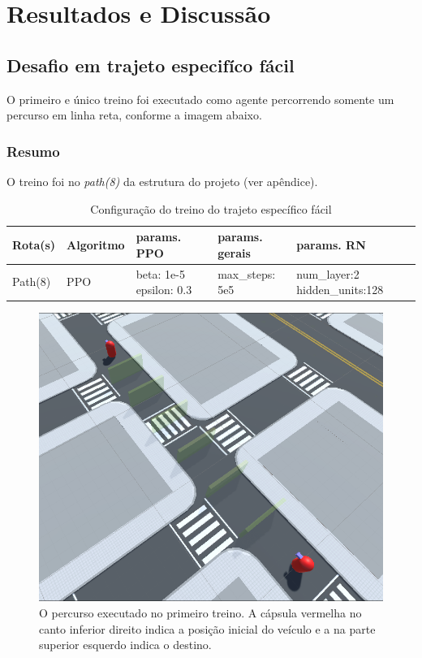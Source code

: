 \chapter{Resultados e Discussão}\label{cap:resultados}

\section{Desafio em trajeto especifíco fácil}

O primeiro e único treino foi executado como agente percorrendo somente um percurso em linha reta, conforme a imagem abaixo.

\subsection*{Resumo}

O treino foi no \textit{path(8)} da estrutura do projeto (ver apêndice).
\begin{table}[htpb]
    \centering
    \caption{Configuração do treino do trajeto específico fácil}
    \begin{tabular}{|l|p{2cm}|p{3cm}|p{3cm}|p{3.5cm}|}
         \hline
         \small{Rota(s)} & \small{Algoritmo} &          \small{params. PPO}         & \small{params. gerais} &          \small{params. RN}        \\ \hline
            Path(8)      &      PPO          &     beta: 1e-5 \newline epsilon: 0.3 &    max\_steps: 5e5  &    num\_layer:2 \newline hidden\_units:128  \\ \hline
    \end{tabular}
 \end{table}

\begin{figure}[h]
    \centering
    \includegraphics[scale=0.35]{figs/rotas/path_14.png}
     \caption{O percurso executado no primeiro treino. A cápsula vermelha no canto inferior direito indica a posição inicial do veículo e a na parte superior esquerdo indica o destino.}
     \label{fig:rota-1}
\end{figure}
 
